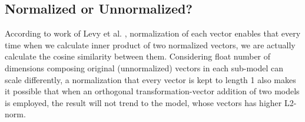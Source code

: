 \subsection{Normalized or Unnormalized?}
	According to work of Levy et al. \cite{levy2015improving}, normalization of each vector enables that every time when we calculate inner product of two normalized vectors, we are actually calculate the cosine similarity between them. Considering float number of dimensions composing original (unnormalized) vectors in each sub-model can scale differently, a normalization that every vector is kept to length 1 also makes it possible that when an orthogonal transformation-vector addition of two models is employed, the result will not trend to the model, whose vectors has higher L2-norm.
